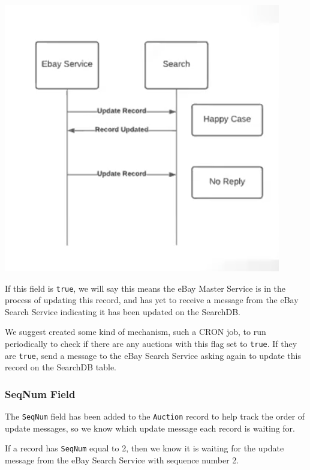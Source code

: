\documentclass[12pt,a4paper]{article}
\begin{document}
\begin{center}
\includegraphics[scale=0.5]{images/no-update.png}
\end{center}



\vspace{\baselineskip}
If this field is \texttt{true}, we will say this means the eBay Master Service is 
in the process of updating this record, and has yet to receive a message from the eBay Search Service 
indicating it has been updated on the SearchDB. 

\vspace{\baselineskip}

We suggest created some kind of mechanism, such a CRON job, to run periodically 
to check if there are any auctions with this flag set to \texttt{true}. 
If they are \texttt{true}, send a message to the eBay Search Service asking again 
to update this record on the SearchDB table.



\subsubsection{SeqNum Field}
The \texttt{SeqNum} field has been added to the \texttt{Auction} record to help
track the order of update messages, so we know which update message each record
is waiting for. 

\vspace{\baselineskip}
If a record has \texttt{SeqNum} equal to 2, then we know it is waiting for the 
update message from the eBay Search Service with sequence number 2.
\end{document}
